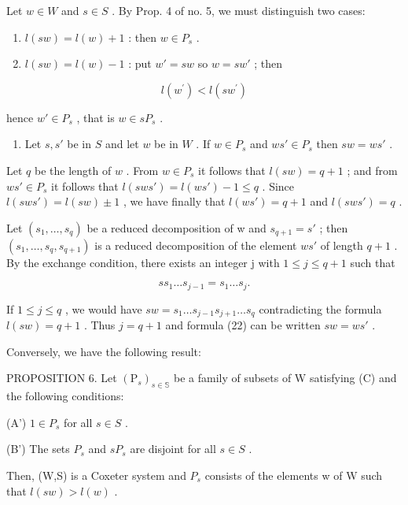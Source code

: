 Let \(w \in W\) and \(s \in S\) . By Prop. 4 of no. 5, we must distinguish two cases:

\begin{enumerate}
\def\labelenumi{\alph{enumi})}
\item
  \(l(sw) = l(w) + 1\) : then \(w \in P_s\) .
\item
  \(l(sw) = l(w) - 1\) : put \(w' = sw\) so \(w = sw'\) ; then
\end{enumerate}

\[
l (w ^ {\prime}) <   l (s w ^ {\prime})
\]

hence \(w' \in P_s\) , that is \(w \in sP_s\) .

\begin{enumerate}
\def\labelenumi{(\Alph{enumi})}
\setcounter{enumi}{2}
\tightlist
\item
  Let \(s, s'\) be in \(S\) and let \(w\) be in \(W\) . If \(w \in P_s\) and \(ws' \in P_s\) then \(sw = ws'\) .
\end{enumerate}

Let \(q\) be the length of \(w\) . From \(w \in P_s\) it follows that \(l(sw) = q + 1\) ; and from \(ws' \in P_s\) it follows that \(l(sws') = l(ws') - 1 \leqslant q\) . Since \(l(sws') = l(sw) \pm 1\) , we have finally that \(l(ws') = q + 1\) and \(l(sws') = q\) .

Let \((s_{1},\ldots,s_{q})\) be a reduced decomposition of w and \(s_{q+1}=s'\) ; then \((s_{1},\ldots,s_{q},s_{q+1})\) is a reduced decomposition of the element \(ws'\) of length \(q+1\) . By the exchange condition, there exists an integer j with \(1\leqslant j\leqslant q+1\) such that

\[
s s _ {1} \dots s _ {j - 1} = s _ {1} \dots s _ {j}.\tag{22}
\]

If \(1 \leqslant j \leqslant q\) , we would have \(sw = s_1 \ldots s_{j-1}s_{j+1} \ldots s_q\) contradicting the formula \(l(sw) = q + 1\) . Thus \(j = q + 1\) and formula (22) can be written \(sw = ws'\) .

Conversely, we have the following result:

PROPOSITION 6. Let \((\mathrm{P}_s)_{s\in \mathbb{S}}\) be a family of subsets of W satisfying (C) and the following conditions:

(A') \(1 \in P_{s}\) for all \(s \in S\) .

(B') The sets \(P_{s}\) and \(sP_{s}\) are disjoint for all \(s \in S\) .

Then, (W,S) is a Coxeter system and \(P_{s}\) consists of the elements w of W such that \(l(sw) > l(w)\) .

